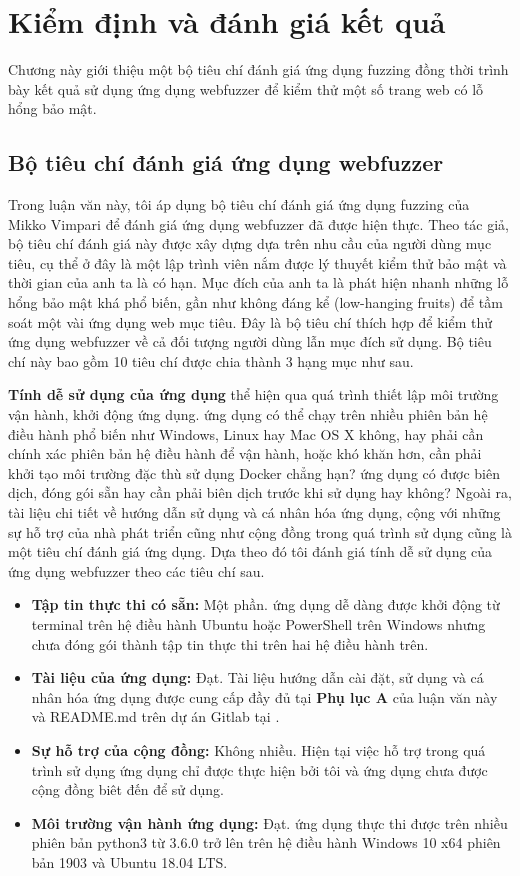\chapter{Kiểm định và đánh giá kết quả}
Chương này giới thiệu một bộ tiêu chí đánh giá ứng dụng fuzzing đồng thời trình bày kết quả sử dụng ứng dụng webfuzzer để kiểm thử một số trang web có lỗ hổng bảo mật. 
\section{Bộ tiêu chí đánh giá ứng dụng webfuzzer}
Trong luận văn này, tôi áp dụng bộ tiêu chí đánh giá ứng dụng fuzzing của Mikko Vimpari \parencite{vimpari2015evaluation} để đánh giá ứng dụng webfuzzer đã được hiện thực. Theo tác giả, bộ tiêu chí đánh giá này được xây dựng dựa trên nhu cầu của người dùng mục tiêu, cụ thể ở đây là một lập trình viên nắm được lý thuyết kiểm thử bảo mật và thời gian của anh ta là có hạn. Mục đích của anh ta là phát hiện nhanh những lỗ hổng bảo mật khá phổ biến, gần như không đáng kể (low-hanging fruits) để tầm soát một vài ứng dụng web mục tiêu. Đây là bộ tiêu chí thích hợp để kiểm thử ứng dụng webfuzzer về cả đối tượng người dùng lẫn mục đích sử dụng. Bộ tiêu chí này bao gồm 10 tiêu chí được chia thành 3 hạng mục như sau.\par 
\textbf{Tính dễ sử dụng của ứng dụng} thể hiện qua quá trình thiết lập môi trường vận hành, khởi động ứng dụng. ứng dụng có thể chạy trên nhiều phiên bản hệ điều hành phổ biến như Windows, Linux hay Mac OS X không, hay phải cần chính xác phiên bản hệ điều hành để vận hành, hoặc khó khăn hơn, cần phải khởi tạo môi trường đặc thù sử dụng Docker chẳng hạn? ứng dụng có được biên dịch, đóng gói sẵn hay cần phải biên dịch trước khi sử dụng hay không? Ngoài ra, tài liệu chi tiết về hướng dẫn sử dụng và cá nhân hóa ứng dụng, cộng với những sự hỗ trợ của nhà phát triển cũng như cộng đồng trong quá trình sử dụng cũng là một tiêu chí đánh giá ứng dụng. Dựa theo đó tôi đánh giá tính dễ sử dụng của ứng dụng webfuzzer theo các tiêu chí sau.
\begin{itemize}
    \item \textbf{Tập tin thực thi có sẵn:} Một phần. ứng dụng dễ dàng được khởi động từ terminal trên hệ điều hành Ubuntu hoặc PowerShell trên Windows nhưng chưa đóng gói thành tập tin thực thi trên hai hệ điều hành trên.
    \item \textbf{Tài liệu của ứng dụng:} Đạt. Tài liệu hướng dẫn cài đặt, sử dụng và cá nhân hóa ứng dụng được cung cấp đầy đủ tại \textbf{Phụ lục A} của luận văn này và README.md trên dự án Gitlab tại \parencite{webfuzzer-gitlab}.
    \item \textbf{Sự hỗ trợ của cộng đồng:} Không nhiều. Hiện tại việc hỗ trợ trong quá trình sử dụng ứng dụng chỉ được thực hiện bởi tôi và ứng dụng chưa được cộng đồng biêt đến để sử dụng.
    \item \textbf{Môi trường vận hành ứng dụng:} Đạt. ứng dụng thực thi được trên nhiều phiên bản python3 từ 3.6.0 trở lên trên hệ điều hành Windows 10 x64 phiên bản 1903 và Ubuntu 18.04 LTS.
\end{itemize}
